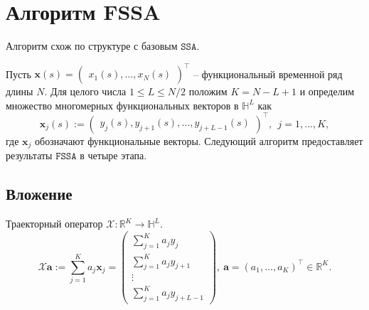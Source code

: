\documentclass[12pt, specialist, subf
]{disser}
\theoremstyle{definition}
\newcommand{\SSA}{\texttt{SSA}}
\newcommand{\FSSA}{\texttt{FSSA}}
\begin{document}







\section{Алгоритм FSSA}
Алгоритм схож по структуре с базовым $\SSA$.

Пусть ${\pmb x}(s)=\begin{pmatrix} x_1(s),\ldots,x_N(s)\end{pmatrix}^\top$ -- функциональный временной ряд длины $N$.
Для целого числа $1\leq L\leq{N}/{2}$ положим $K=N-L+1$ и определим множество многомерных функциональных векторов в $\mathbb{H}^L$ как
\begin{equation}\label{flvec}
	{\pmb x}_j(s):= \begin{pmatrix} y_j(s), y_{j+1}(s), \ldots, y_{j+L-1}(s)\end{pmatrix}^\top,\ \ j=1,\ldots, K,
\end{equation}
где ${\pmb x}_j$ обозначают функциональные векторы. Следующий алгоритм предоставляет результаты $\FSSA$ в четыре этапа.

\subsection*{Вложение}
Траекторный оператор $\mathcal{X}:\mathbb{R}^K \rightarrow \mathbb{H}^L$.
\begin{equation}
	\label{eq:traj}
	\mathcal{X}{\pmb a}:=\sum_{j=1}^K a_j{\pmb x}_j=
	\begin{pmatrix} \sum_{j=1}^K a_jy_j\\ \sum_{j=1}^K a_j y_{j+1}\\ \vdots\\ \sum_{j=1}^K a_j y_{j+L-1} \end{pmatrix},
	\ {\pmb a}=\left(a_1,\ldots, a_K\right)^\top \in\mathbb{R}^K.
\end{equation}
\end{document}
